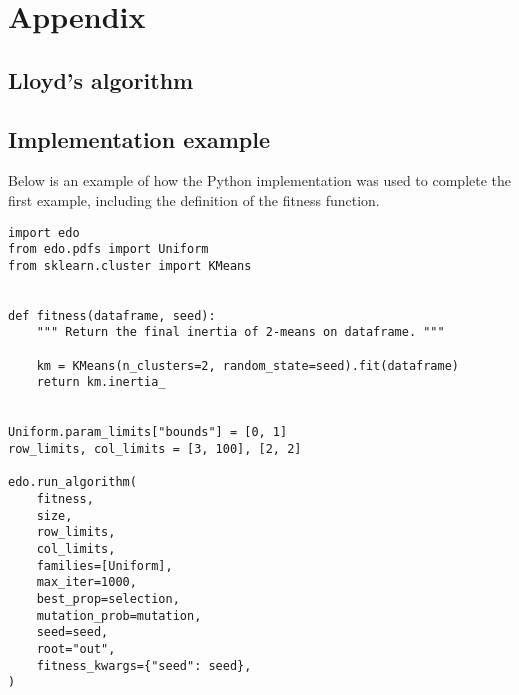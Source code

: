 \appendix
\section{Appendix}

\subsection{Lloyd's algorithm}\label{app:kmeans}



\subsection{Implementation example}\label{app:code}

Below is an example of how the Python implementation was used to complete the
first example, including the definition of the fitness function.

\begin{verbatim}
import edo
from edo.pdfs import Uniform
from sklearn.cluster import KMeans


def fitness(dataframe, seed):
    """ Return the final inertia of 2-means on dataframe. """

    km = KMeans(n_clusters=2, random_state=seed).fit(dataframe)
    return km.inertia_


Uniform.param_limits["bounds"] = [0, 1]
row_limits, col_limits = [3, 100], [2, 2]

edo.run_algorithm(
    fitness,
    size,
    row_limits,
    col_limits,
    families=[Uniform],
    max_iter=1000,
    best_prop=selection,
    mutation_prob=mutation,
    seed=seed,
    root="out",
    fitness_kwargs={"seed": seed},
)
\end{verbatim}
